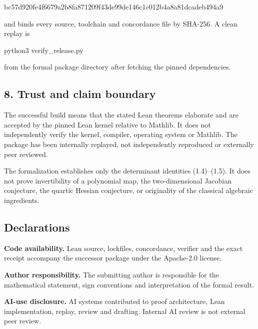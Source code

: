 \documentclass[
  11pt,
  a4paper,
]{article}
\newenvironment{Shaded}{}{}
\newcommand{\ExtensionTok}[1]{#1}
\newcommand{\NormalTok}[1]{#1}
\begin{document}
\begin{Shaded}
\begin{Highlighting}[]
\NormalTok{bc57d920fe4f6679a2b8fa871209f43de99de146c1c012b4a8a81dcadeb494a9}
\end{Highlighting}
\end{Shaded}

and binds every source, toolchain and concordance file by SHA-256. A
clean replay is

\begin{Shaded}
\begin{Highlighting}[]
\ExtensionTok{python3}\NormalTok{ verify\_release.py}
\end{Highlighting}
\end{Shaded}

from the formal package directory after fetching the pinned
dependencies.

\subsection{8. Trust and claim boundary}\label{trust-and-claim-boundary}

The successful build means that the stated Lean theorems elaborate and
are accepted by the pinned Lean kernel relative to Mathlib. It does not
independently verify the kernel, compiler, operating system or Mathlib.
The package has been internally replayed, not independently reproduced
or externally peer reviewed.

The formalization establishes only the determinant identities
(1.4)--(1.5). It does not prove invertibility of a polynomial map, the
two-dimensional Jacobian conjecture, the quartic Hessian conjecture, or
originality of the classical algebraic ingredients.

\subsection{Declarations}\label{declarations}

\textbf{Code availability.} Lean source, lockfiles, concordance,
verifier and the exact receipt accompany the successor package under the
Apache-2.0 license.

\textbf{Author responsibility.} The submitting author is responsible for
the mathematical statement, sign conventions and interpretation of the
formal result.

\textbf{AI-use disclosure.} AI systems contributed to proof
architecture, Lean implementation, replay, review and drafting. Internal
AI review is not external peer review.
\end{document}
